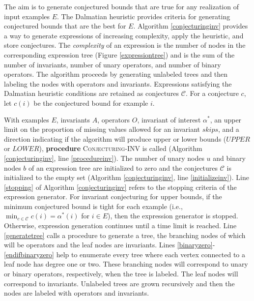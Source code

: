 \documentclass[ijds,nonblindrev]{informs-ijds}
\begin{document}

The aim is to generate conjectured bounds that are true for any realization of input examples $E$.  The Dalmatian heuristic provides criteria for generating conjectured bounds that are the best for $E$.   Algorithm \ref{conjecturinginv} provides a way to generate expressions of increasing complexity, apply the heuristic, and store conjectures.  The {\it complexity} of an expression is the number of nodes in the corresponding expression tree (Figure \ref{expressiontree}) and is the sum of the number of invariants, number of unary operators, and number of binary operators.  The algorithm proceeds by generating unlabeled trees and then labeling the nodes with operators and invariants.  Expressions satisfying the Dalmatian heuristic conditions are retained as conjectures $\mathcal{C}$.  For a conjecture $c$, let $c(i)$ be the conjectured bound for example $i$.  

With examples $E$, invariants $A$, operators $O$, invariant of interest $\alpha^*$, an upper limit on the proportion of missing values allowed for an invariant $skips$, and a direction  indicating if the algorithm will produce upper or lower bounds ($UPPER$ or $LOWER$), {\bf procedure} \textsc{Conjecturing-INV} is called (Algorithm \ref{conjecturinginv}, line \ref{procedureinv}).  The number of unary nodes $u$ and binary nodes $b$ of an expression tree are initialized to zero and the conjectures $\mathcal{C}$ is initialized to the empty set  (Algorithm \ref{conjecturinginv}, line \ref{initializeinv}).  Line \ref{stopping} of Algorithm \ref{conjecturinginv} refers to the stopping criteria of the expression generator.  For invariant conjecturing for upper bounds, if the minimum conjectured bound is tight for each example (i.e., $\min_{c \in \mathcal{C}} c(i) = \alpha^*(i)$ for $i\in E$), then the expression generator is stopped.  Otherwise, expression generation continues until a time limit is reached.  Line \ref{generatetree} calls a procedure to generate a tree, the branching nodes of which will be operators and the leaf nodes are invariants.  Lines \ref{binaryzero}-\ref{endifbinaryzero} help to enumerate every tree where each vertex connected to a leaf node has degree one or two.  These branching nodes will correspond to unary or binary operators, respectively, when the tree is labeled.  The leaf nodes will correspond to invariants.  Unlabeled trees are grown recursively and then the nodes are labeled with operators and invariants. 
\end{document}

